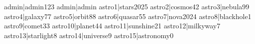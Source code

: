
admin|admin123
admin|admin
astro1|stars2025
astro2|cosmos42
astro3|nebula99
astro4|galaxy77
astro5|orbit88
astro6|quasar55
astro7|nova2024
astro8|blackhole1
astro9|comet33
astro10|planet44
astro11|sunshine21
astro12|milkyway7
astro13|starlight8
astro14|universe9
astro15|astronomy0
